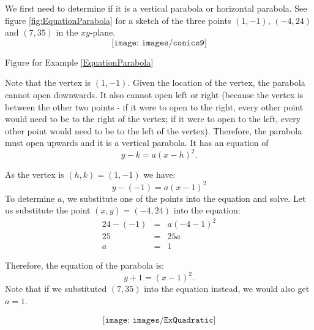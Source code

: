 \begin{solution} 
We first need to determine if it is a vertical parabola or horizontal parabola.
See figure \ref{fig:EquationParabola} for a sketch of the three points $(1,-1)$, $(-4, 24)$ and $(7, 35)$ in the $xy$-plane.
\figure[!ht]
$$\texttt{[image: images/conics9]}$$
\caption{Figure for Example \ref{EquationParabola}\label{fig:EquationParabola}}
\endfigure
Note that the vertex is $(1,-1)$.
Given the location of the vertex, the parabola cannot open downwards.
It also cannot open left or right (because the vertex is between the other two points - if it were to open to the right, every other point would need to be to the right of the vertex; if it were to open to the left, every other point would need to be to the left of the vertex).
Therefore, the parabola must open upwards and it is a vertical parabola.
It has an equation of
$$y-k=a(x-h)^2.$$
\begin{multicols}{2}
As the vertex is $(h,k)=(1,-1)$ we have:
$$y-(-1)=a(x-1)^2$$
To determine $a$, we substitute one of the points into the equation and solve.
Let us substitute the point $(x,y)=(-4,24)$ into the equation:\\
$$\begin{array}{rcl}
24-(-1) & = & a(-4-1)^2 \\
25 & = & 25a \\
a & = & 1
\end{array}$$

Therefore, the equation of the parabola is:
$$y+1=(x-1)^2.$$
Note that if we substituted $(7,35)$ into the equation instead, we would also get $a=1$.

$$\texttt{[image: images/ExQuadratic]}$$
\end{multicols}

\end{solution}


